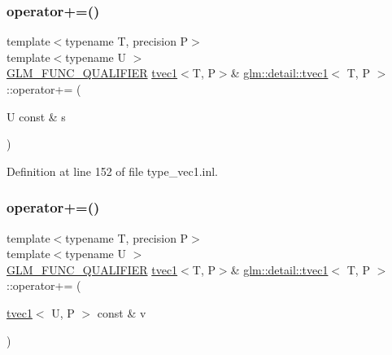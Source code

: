\mbox{\label{structglm_1_1detail_1_1tvec1_ac367841556827c8b6a27e242490a7eef}} 
\subsubsection{\texorpdfstring{operator+=()}{operator+=()}\hspace{0.1cm}{\footnotesize\ttfamily [3/4]}}
{\footnotesize\ttfamily template$<$typename T, precision P$>$ \\
template$<$typename U $>$ \\
\hyperlink{setup_8hpp_a33fdea6f91c5f834105f7415e2a64407}{G\+L\+M\+\_\+\+F\+U\+N\+C\+\_\+\+Q\+U\+A\+L\+I\+F\+I\+ER} \hyperlink{structglm_1_1detail_1_1tvec1}{tvec1}$<$T, P$>$\& \hyperlink{structglm_1_1detail_1_1tvec1}{glm\+::detail\+::tvec1}$<$ T, P $>$\+::operator+= (\begin{DoxyParamCaption}\item[{U const \&}]{s }\end{DoxyParamCaption})}



Definition at line 152 of file type\+\_\+vec1.\+inl.

\mbox{\label{structglm_1_1detail_1_1tvec1_a7513234bbb5711f30b59e0c94d8b0c46}} 
\subsubsection{\texorpdfstring{operator+=()}{operator+=()}\hspace{0.1cm}{\footnotesize\ttfamily [4/4]}}
{\footnotesize\ttfamily template$<$typename T, precision P$>$ \\
template$<$typename U $>$ \\
\hyperlink{setup_8hpp_a33fdea6f91c5f834105f7415e2a64407}{G\+L\+M\+\_\+\+F\+U\+N\+C\+\_\+\+Q\+U\+A\+L\+I\+F\+I\+ER} \hyperlink{structglm_1_1detail_1_1tvec1}{tvec1}$<$T, P$>$\& \hyperlink{structglm_1_1detail_1_1tvec1}{glm\+::detail\+::tvec1}$<$ T, P $>$\+::operator+= (\begin{DoxyParamCaption}\item[{\hyperlink{structglm_1_1detail_1_1tvec1}{tvec1}$<$ U, P $>$ const \&}]{v }\end{DoxyParamCaption})}



